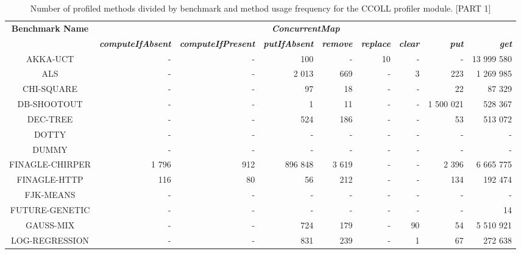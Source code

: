 \documentclass[]{usiinfthesis}
\begin{document}
\begin{table}
\centering
\caption[Method Usage Frequencies for CCOLL pt.1]{Number of profiled methods divided by benchmark and method usage frequency for the CCOLL profiler module. [PART 1]}
\label{tab:4}
\begin{tabular}{|c|r|r|r|r|r|r|r|r|}
\hline

\textbf{ 	 Benchmark Name 	 } & \multicolumn{8}{c|}{\textbf{\textit{ConcurrentMap}}} \\ 
   &\textbf{\textit{ 	 computeIfAbsent 	 }}&\textbf{\textit{ 	 computeIfPresent 	 }}&\textbf{\textit{ 	 putIfAbsent 	 }}&\textbf{\textit{ 	 remove 	 }}&\textbf{\textit{ 	 replace 	 }}&\textbf{\textit{ 	 clear 	 }}&\textbf{\textit{ 	 put 	 }}&\textbf{\textit{ 	 get 	 }}\\\hline 
	 AKKA-UCT 	 & 	 -   	 & 	 -   	 & 	 100 	 & 	 -   	 & 	 10 	 & 	 -   	 & 	 -   	 & 	 13 999 580 	 \\ 
	 ALS 	 & 	 -   	 & 	 -   	 & 	 2 013 	 & 	 669 	 & 	 -   	 & 	 3 	 & 	 223 	 & 	 1 269 985 	 \\ 
	 CHI-SQUARE 	 & 	 -   	 & 	 -   	 & 	 97 	 & 	 18 	 & 	 -   	 & 	 -   	 & 	 22 	 & 	 87 329 	 \\ 
	 DB-SHOOTOUT 	 & 	 -   	 & 	 -   	 & 	 1 	 & 	 11 	 & 	 -   	 & 	 -   	 & 	 1 500 021 	 & 	 528 367 	 \\ 
	 DEC-TREE 	 & 	 -   	 & 	 -   	 & 	 524 	 & 	 186 	 & 	 -   	 & 	 -   	 & 	 53 	 & 	 513 072 	 \\ 
	 DOTTY 	 & 	 -   	 & 	 -   	 & 	 -   	 & 	 -   	 & 	 -   	 & 	 -   	 & 	 -   	 & 	 -   	 \\ 
	 DUMMY 	 & 	 -   	 & 	 -   	 & 	 -   	 & 	 -   	 & 	 -   	 & 	 -   	 & 	 -   	 & 	 -   	 \\ 
	 FINAGLE-CHIRPER 	 & 	 1 796 	 & 	 912 	 & 	 896 848 	 & 	 3 619 	 & 	 -   	 & 	 -   	 & 	 2 396 	 & 	 6 665 775 	 \\ 
	 FINAGLE-HTTP 	 & 	 116 	 & 	 80 	 & 	 56 	 & 	 212 	 & 	 -   	 & 	 -   	 & 	 134 	 & 	 192 474 	 \\ 
	 FJK-MEANS 	 & 	 -   	 & 	 -   	 & 	 -   	 & 	 -   	 & 	 -   	 & 	 -   	 & 	 -   	 & 	 -   	 \\ 
	 FUTURE-GENETIC 	 & 	 -   	 & 	 -   	 & 	 -   	 & 	 -   	 & 	 -   	 & 	 -   	 & 	 -   	 & 	 14 	 \\ 
	 GAUSS-MIX 	 & 	 -   	 & 	 -   	 & 	 724 	 & 	 179 	 & 	 -   	 & 	 90 	 & 	 54 	 & 	 5 510 921 	 \\ 
	 LOG-REGRESSION 	 & 	 -   	 & 	 -   	 & 	 831 	 & 	 239 	 & 	 -   	 & 	 1 	 & 	 67 	 & 	 272 638 	 \\ 

\end{tabular}
\end{table}
\end{document}
